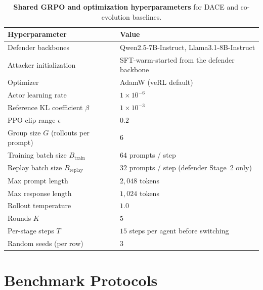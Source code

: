 \documentclass{article}
\newcommand{\method}{\textsc{DACE}\xspace}
\begin{document}
\begin{table}[h]
  \centering
  \small
  \caption{\textbf{Shared GRPO and optimization hyperparameters} for \method and co-evolution baselines.}
  \label{tab:rl-hyperparams}
  \setlength{\tabcolsep}{6pt}
  \renewcommand{\arraystretch}{1.12}
  \begin{tabular}{ll}
    \toprule
    \textbf{Hyperparameter} & \textbf{Value} \\
    \midrule
    Defender backbones & Qwen2.5-7B-Instruct, Llama3.1-8B-Instruct \\
    Attacker initialization & SFT-warm-started from the defender backbone \\
    Optimizer & AdamW (veRL default) \\
    Actor learning rate & $1\times 10^{-6}$ \\
    Reference KL coefficient $\beta$ & $1\times 10^{-3}$ \\
    PPO clip range $\epsilon$ & $0.2$ \\
    Group size $G$ (rollouts per prompt) & $6$ \\
    Training batch size $B_{\mathrm{train}}$ & $64$ prompts / step \\
    Replay batch size $B_{\mathrm{replay}}$ & $32$ prompts / step (defender Stage~2 only) \\
    Max prompt length & $2{,}048$ tokens \\
    Max response length & $1{,}024$ tokens \\
    Rollout temperature & $1.0$ \\
    Rounds $K$ & $5$ \\
    Per-stage steps $T$ & $15$ steps per agent before switching \\
    Random seeds (per row) & $3$ \\
    \bottomrule
  \end{tabular}
\end{table}


\section{Benchmark Protocols}
\label{apdx:bench-protocol}
\end{document}
